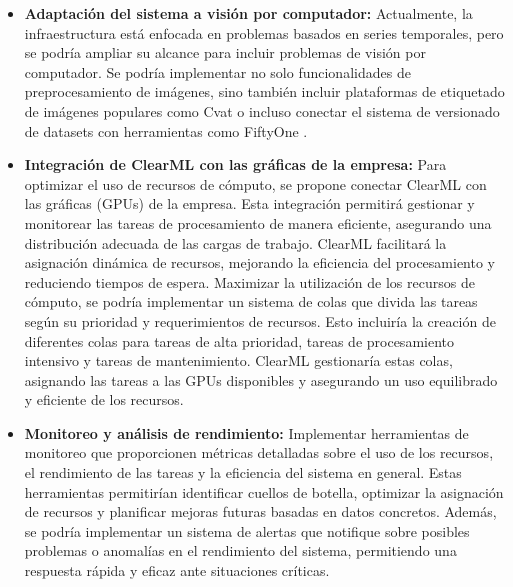 \begin{itemize}
    \item \textbf{Adaptación del sistema a visión por computador:} Actualmente, la infraestructura 
    está enfocada en problemas basados en series temporales, pero se podría ampliar
    su alcance para incluir problemas de visión por computador. Se podría implementar
    no solo funcionalidades de preprocesamiento de imágenes, sino también incluir
    plataformas de etiquetado de imágenes populares como Cvat \cite{CVAT} o incluso conectar el
    sistema de versionado de datasets con herramientas como FiftyOne \cite{FiftyOne}.
    \item \textbf{Integración de ClearML con las gráficas de la empresa:} Para 
    optimizar el uso de recursos de cómputo, se propone conectar ClearML con las 
    gráficas (GPUs) de la empresa. Esta integración permitirá gestionar y monitorear las 
    tareas de procesamiento de manera eficiente, asegurando una distribución adecuada de las 
    cargas de trabajo. ClearML facilitará la asignación dinámica de recursos, mejorando 
    la eficiencia del procesamiento y reduciendo tiempos de espera. Maximizar la utilización de 
    los recursos de cómputo, se podría implementar un sistema de colas que divida las tareas 
    según su prioridad y requerimientos de recursos. Esto incluiría la creación de diferentes 
    colas para tareas de alta prioridad, tareas de procesamiento intensivo y tareas de 
    mantenimiento. ClearML gestionaría estas colas, asignando las tareas a las GPUs 
    disponibles y asegurando un uso equilibrado y eficiente de los recursos.
    \item \textbf{Monitoreo y análisis de rendimiento:} Implementar herramientas de monitoreo 
    que proporcionen métricas detalladas sobre el uso de los recursos, el rendimiento de las 
    tareas y la eficiencia del sistema en general. Estas herramientas permitirían identificar 
    cuellos de botella, optimizar la asignación de recursos y planificar mejoras futuras 
    basadas en datos concretos. Además, se podría implementar un sistema de alertas que
    notifique sobre posibles problemas o anomalías en el rendimiento del sistema, permitiendo
    una respuesta rápida y eficaz ante situaciones críticas.
\end{itemize}